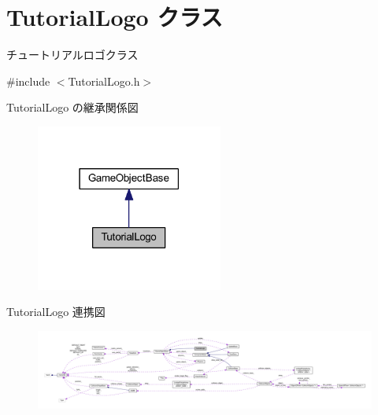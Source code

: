 \hypertarget{class_tutorial_logo}{}\section{Tutorial\+Logo クラス}
\label{class_tutorial_logo}


チュートリアルロゴクラス  




{\ttfamily \#include $<$Tutorial\+Logo.\+h$>$}



Tutorial\+Logo の継承関係図\nopagebreak
\begin{figure}[H]
\begin{center}
\leavevmode
\includegraphics[width=174pt]{class_tutorial_logo__inherit__graph}
\end{center}
\end{figure}


Tutorial\+Logo 連携図\nopagebreak
\begin{figure}[H]
\begin{center}
\leavevmode
\includegraphics[width=350pt]{class_tutorial_logo__coll__graph}
\end{center}
\end{figure}
